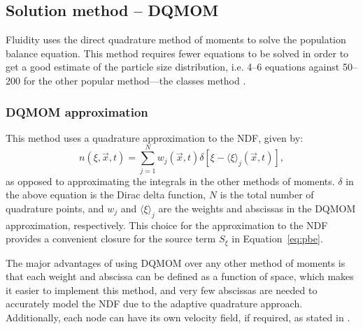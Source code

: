 \subsection{Solution method -- DQMOM}

Fluidity uses the direct quadrature method of moments \citep{marchisio2005solution} to solve the population balance equation.
This method requires fewer equations to be solved in order to get a good estimate of the particle size distribution, i.e. 4--6 equations against 50--200 for the other popular method---the classes method \citep{marchisio2003quadratureb}. 
\subsubsection{DQMOM approximation}
This method uses a quadrature approximation to the NDF, given by:
\begin{equation}
n \left( \xi, \vec{x}, t \right) = \sum_{j=1}^N w_{j} \left( \vec{x}, t \right) \delta \left[ \xi - \langle \xi \rangle_{j} \left( \vec{x}, t \right) \right],
\label{eq:DQMOM_ndf}
\end{equation}
as opposed to approximating the integrals in the other methods of moments. $\delta$ in the above equation is the Dirac delta function, $N$ is the total number of quadrature points, and $w_j$ and $\langle \xi \rangle_{j}$ are the weights and abscissas in the DQMOM approximation, respectively. This choice for the approximation to the NDF provides a convenient closure for the source term $S_{\xi}$ in Equation~\eqref{eq:pbe}.

The major advantages of using DQMOM over any other method of moments is that each weight and abscissa can be defined as a function of space, which makes it easier to implement this method, and very few abscissas are needed to accurately model the NDF due to the adaptive quadrature approach.
Additionally, each node can have its own velocity field, if required, as stated in \citet{marchisio2005solution}.

